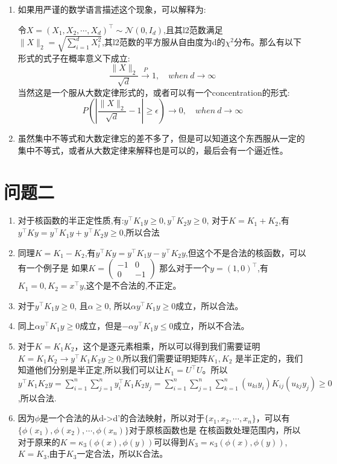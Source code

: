 \documentclass[answers]{exam}  %
\begin{document}
\begin{enumerate}[label=\alph*.]
    \item 如果用严谨的数学语言描述这个现象，可以解释为:
    \par 令$X = (X_1, X_2, \cdots, X_d)^\top\sim \mathcal{N}(0, I_d)$,且其l2范数满足
    $\|X\|_2 = \sqrt{\sum_{i=1}^{d} X_i^2}$,其l2范数的平方服从自由度为d的$\chi^2$分布。那么有以下形式的式子在概率意义下成立:
    \begin{equation*}
        \frac{\|X\|_2}{\sqrt{d}} \xrightarrow{P} 1, \quad when\ d \rightarrow \infty
    \end{equation*}
    当然这是一个服从大数定律形式的，或者可以有一个concentration的形式:
    \begin{equation*}
        P(|\frac{\|X\|_2}{\sqrt{d}} - 1| \geq \epsilon) \rightarrow 0, \quad when\ d \rightarrow \infty
    \end{equation*}
    \item 虽然集中不等式和大数定律忘的差不多了，但是可以知道这个东西服从一定的集中不等式，或者从大数定律来解释也是可以的，最后会有一个逼近性。
\end{enumerate}

\section{问题二}
\begin{enumerate}[label=\alph*.] 
    \item 对于核函数的半正定性质,有:$y^\top K_1 y \geq 0, y^\top K_2 y \geq 0$,
    对于$K = K_1 + K_2$,有$y^\top K y = y^\top K_1 y + y^\top K_2 y \geq 0$,所以合法
    \item 同理$K = K_1 - K_2$,有$y^\top K y = y^\top K_1 y - y^\top K_2 y$,但这个不是合法的核函数，可以有一个例子是
    如果$K = 
    \begin{pmatrix}  
        -1 & 0 \\
        0 & -1 
    \end{pmatrix}$
    那么对于一个$y = (1, 0)^\top$,有$K_1 = 0, K_2 = x^\top y$,这个是不合法的,不正定。
    \item 对于$y^\top K_1y \geq 0$, 且$\alpha\geq 0$, 所以$\alpha y^\top K_1 y \geq 0$成立，所以合法。
    \item 同上$\alpha y^\top K_1 y \geq 0$成立，但是$-\alpha y^\top K_1 y \leq 0$成立，所以不合法。
    \item 对于$K = K_1 K_2$，这个是逐元素相乘，所以可以得到我们需要证明$K = K_1 K_2 \rightarrow y^\top K_1 K_2 y \geq 0$,所以我们需要证明矩阵$K_1, K_2$
    是半正定的，我们知道他们分别是半正定,所以我们可以让$K_1 = U^\top U$。所以$y^\top K_1 K_2 y  = \sum_{i=1}^{n}\sum_{j=1}^{n} y_i^\top K_1  K_2 y_j 
    = \sum_{i=1}^{n}\sum_{j=1}^{n}\sum_{k=1}^{n} (u_{ki}y_i) K_{ij} (u_{kj}y_j) \geq 0 $,所以合法.
    \item 因为$\phi$是一个合法的从d->d'的合法映射，所以对于$\{x_1, x_2, \cdots, x_n\}$，可以有$\{\phi(x_1), \phi(x_2), \cdots, \phi(x_n)\}$对于原核函数也是
    在核函数处理范围内，所以对于原来的$K = \kappa_3(\phi(x), \phi(y))$可以得到$K_3 = \kappa_3(\phi(x), \phi(y))$,$K = K_3$,由于$K_3$一定合法，所以K合法。
\end{enumerate}
\end{document}
